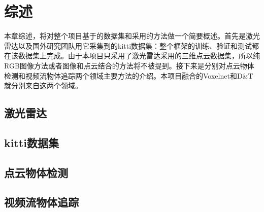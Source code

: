 \chapter{综述}
\label{cha:review}
本章综述，将对整个项目基于的数据集和采用的方法做一个简要概述。首先是激光雷达以及国外研究团队用它采集到的kitti数据集：整个框架的训练、验证和测试都在该数据集上完成。由于本项目只采用了激光雷达采用的三维点云数据集，所以纯RGB图像方法或者图像和点云结合的方法将不被提到。接下来是分别对点云物体检测和视频流物体追踪两个领域主要方法的介绍。本项目融合的Voxelnet和D&T就分别来自这两个领域。

\section{激光雷达}
\label{LiDAR}

\section{kitti数据集}
\label{sec:kitti}

\section{点云物体检测}
\label{sec:Detection_in_Point_Cloud}

\section{视频流物体追踪}
\label{sec:Tracking_in_Video}



